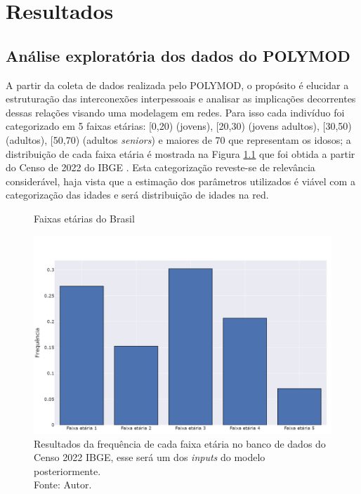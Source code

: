 \chapter{Resultados}
\label{chap:resultados}
\section{Análise exploratória dos dados do POLYMOD}

A partir da coleta de dados realizada pelo POLYMOD, o propósito é elucidar a estruturação das interconexões interpessoais e analisar as implicações decorrentes dessas relações visando uma modelagem em redes. Para isso cada indivíduo foi categorizado em 5 faixas etárias: [0,20) (jovens), [20,30) (jovens adultos), [30,50) (adultos), [50,70) (adultos \textit{seniors}) e maiores de 70 que representam os idosos; a distribuição de cada faixa etária é mostrada na Figura \ref{fig:freq} que foi obtida a partir do Censo de 2022 do IBGE \cite{ibgeCenso2022}. Esta categorização reveste-se de relevância considerável, haja vista que a estimação dos parâmetros utilizados é viável com a categorização das idades e será distribuição de idades na red.

\begin{figure}[H]
    \centering

    \captionsetup{font=normalsize,skip=0.8pt,singlelinecheck=on,labelsep=endash}
    \caption{Faixas etárias do Brasil}
    \includegraphics[scale= 0.4]{figuras/faixas_brasil.png}
    \captionsetup{font=small,justification=justified}
    \caption*{Resultados da frequência de cada faixa etária no banco de dados do Censo 2022 IBGE, esse será um dos \textit{inputs} do modelo posteriormente.\\ Fonte: Autor.}

    \label{fig:freq}
\end{figure}

